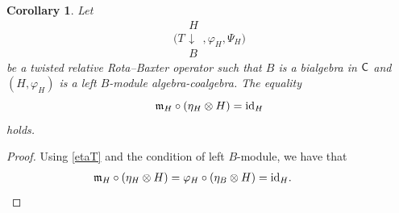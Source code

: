 \documentclass[10pt,a4paper]{amsart}
\numberwithin{equation}{section}
\newtheorem{Corollary}[Theorem]{Corollary}
\begin{document}
\begin{Corollary}
Let
\[
\Biggl(T\begin{array}{c}H\\\downarrow\\B\end{array},\varphi_{H},\Psi_{H}\Biggr)
\]
 be a twisted relative Rota--Baxter operator such that $B$ is a bialgebra in ${\sf C}$ and $(H,\varphi_{H})$ is a left $B$-module algebra-coalgebra. The equality
\begin{equation}\label{frakmHeta}
\mathfrak{m}_{H}\circ(\eta_{H}\otimes H)={\rm id}_{H}
\end{equation}
holds.
\end{Corollary}
\begin{proof}
Using \eqref{etaT} and the condition of left $B$-module, we have that
\begin{align*}
&\mathfrak{m}_{H}\circ(\eta_{H}\otimes H)=\varphi_{H}\circ(\eta_{B}\otimes H)={\rm id}_{H}.\tag*{\qed}
\end{align*}
\renewcommand{\qed}{}
\end{proof}
\end{document}
